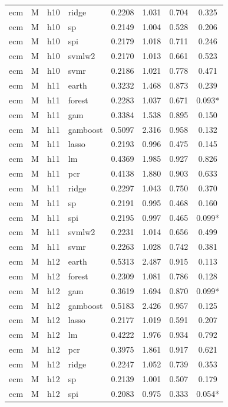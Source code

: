 \begin{ThreePartTable}
\begin{longtable}[t]{llclcccc}
ecm & M & h10 & ridge & 0.2208 & 1.031 & 0.704 & 0.325\\
ecm & M & h10 & sp & 0.2149 & 1.004 & 0.528 & 0.206\\
ecm & M & h10 & spi & 0.2179 & 1.018 & 0.711 & 0.246\\
ecm & M & h10 & svmlw2 & 0.2170 & 1.013 & 0.661 & 0.523\\
ecm & M & h10 & svmr & 0.2186 & 1.021 & 0.778 & 0.471\\
\addlinespace
ecm & M & h11 & earth & 0.3232 & 1.468 & 0.873 & 0.239\\
ecm & M & h11 & forest & 0.2283 & 1.037 & 0.671 & 0.093*\\
ecm & M & h11 & gam & 0.3384 & 1.538 & 0.895 & 0.150\\
ecm & M & h11 & gamboost & 0.5097 & 2.316 & 0.958 & 0.132\\
ecm & M & h11 & lasso & 0.2193 & 0.996 & 0.475 & 0.145\\
ecm & M & h11 & lm & 0.4369 & 1.985 & 0.927 & 0.826\\
ecm & M & h11 & pcr & 0.4138 & 1.880 & 0.903 & 0.633\\
ecm & M & h11 & ridge & 0.2297 & 1.043 & 0.750 & 0.370\\
ecm & M & h11 & sp & 0.2191 & 0.995 & 0.468 & 0.160\\
ecm & M & h11 & spi & 0.2195 & 0.997 & 0.465 & 0.099*\\
ecm & M & h11 & svmlw2 & 0.2231 & 1.014 & 0.656 & 0.499\\
ecm & M & h11 & svmr & 0.2263 & 1.028 & 0.742 & 0.381\\
\addlinespace
ecm & M & h12 & earth & 0.5313 & 2.487 & 0.915 & 0.113\\
ecm & M & h12 & forest & 0.2309 & 1.081 & 0.786 & 0.128\\
ecm & M & h12 & gam & 0.3619 & 1.694 & 0.870 & 0.099*\\
ecm & M & h12 & gamboost & 0.5183 & 2.426 & 0.957 & 0.125\\
ecm & M & h12 & lasso & 0.2177 & 1.019 & 0.591 & 0.207\\
ecm & M & h12 & lm & 0.4222 & 1.976 & 0.934 & 0.792\\
ecm & M & h12 & pcr & 0.3975 & 1.861 & 0.917 & 0.621\\
ecm & M & h12 & ridge & 0.2247 & 1.052 & 0.739 & 0.353\\
ecm & M & h12 & sp & 0.2139 & 1.001 & 0.507 & 0.179\\
ecm & M & h12 & spi & 0.2083 & 0.975 & 0.333 & 0.054*\\

\end{longtable}
\end{ThreePartTable}
